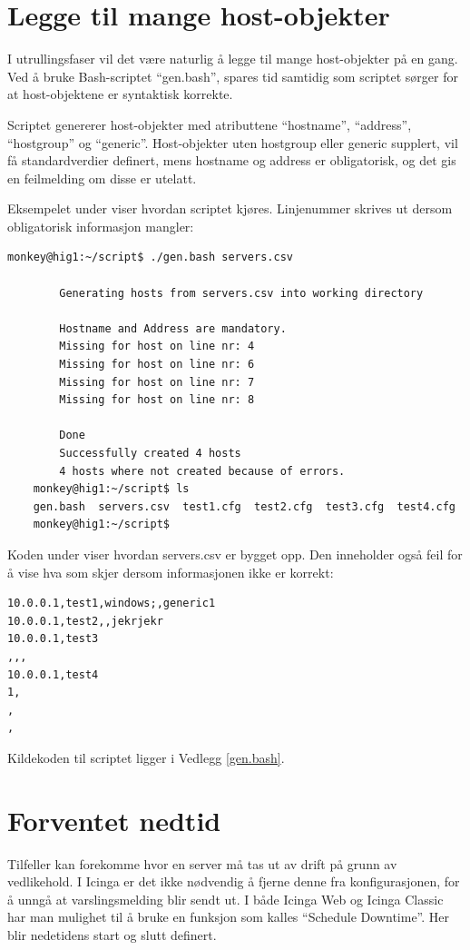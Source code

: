 \section{Legge til mange host-objekter}
I utrullingsfaser vil det være naturlig å legge til mange host-objekter på en gang. Ved å bruke Bash-scriptet ``gen.bash'', spares tid samtidig som scriptet sørger for at host-objektene er syntaktisk korrekte.

Scriptet genererer host-objekter med atributtene  ``hostname'', ``address'', ``hostgroup'' og ``generic''. Host-objekter uten hostgroup eller generic supplert, vil få standardverdier definert, mens hostname og address er obligatorisk, og det gis en feilmelding om disse er utelatt.

Eksempelet under viser hvordan scriptet kjøres. Linjenummer skrives ut dersom obligatorisk informasjon mangler:
\begin{lstlisting}[style=example]
monkey@hig1:~/script$ ./gen.bash servers.csv

		Generating hosts from servers.csv into working directory

		Hostname and Address are mandatory.
		Missing for host on line nr: 4
		Missing for host on line nr: 6
		Missing for host on line nr: 7
		Missing for host on line nr: 8

		Done
		Successfully created 4 hosts
		4 hosts where not created because of errors.
	monkey@hig1:~/script$ ls
	gen.bash  servers.csv  test1.cfg  test2.cfg  test3.cfg  test4.cfg
	monkey@hig1:~/script$
	\end{lstlisting}

Koden under viser hvordan servers.csv er bygget opp. Den inneholder også feil for å vise hva som skjer dersom informasjonen ikke er korrekt:
\begin{lstlisting}
10.0.0.1,test1,windows;,generic1
10.0.0.1,test2,,jekrjekr
10.0.0.1,test3
,,,
10.0.0.1,test4
1,
,
,
\end{lstlisting}

	Kildekoden til scriptet ligger i Vedlegg \ref{gen.bash}.

\section{Forventet nedtid}
Tilfeller kan forekomme hvor en server må tas ut av drift på grunn av vedlikehold. I Icinga er det ikke nødvendig å fjerne denne fra konfigurasjonen, for å unngå at varslingsmelding blir sendt ut. I både Icinga Web og Icinga Classic har man mulighet til å bruke en funksjon som kalles ``Schedule Downtime''. Her blir nedetidens start og slutt definert.

